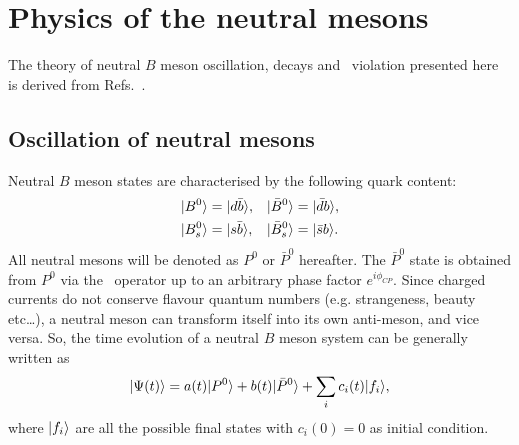 \section[Physics of the neutral $B$ mesons]{Physics of the neutral  mesons}
\label{sec:Bphysics}

The theory of neutral $B$ meson oscillation, decays and \CP~violation presented here is derived from Refs.~\cite{PDG,CPviolation}.

\subsection{Oscillation of neutral mesons}

Neutral $B$ meson states are characterised by the following quark content:
\begin{align}
	|B^0\rangle &= |d\bar b\rangle, & |\bar B^0\rangle &= |\bar d b\rangle, \\
	|B_s^0\rangle &= |s\bar b\rangle, & |\bar B_s^0\rangle &= |\bar s b\rangle. 
\end{align}
All neutral mesons will be denoted as $P^0$ or $\bar P^0$ hereafter. The $\bar P^0$ state is obtained from $P^0$
via the \CP~operator up to an arbitrary phase factor $e^{i\phi_{CP}}$.
Since charged currents do not conserve flavour quantum numbers (e.g. strangeness, beauty etc\dots),
a neutral meson can transform itself into its own anti-meson, and vice versa. 
So, the time evolution of a neutral $B$ meson system can be generally written as
\begin{equation}
	|\Psi(t)\rangle = a(t)|P^0\rangle + b(t)|\bar P^0\rangle + \sum_i c_i(t) |f_i\rangle,
\end{equation}
where $|f_i\rangle$ are all the possible final states with $c_i(0)=0$ as initial condition.


